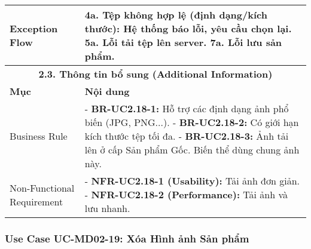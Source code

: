 \begin{longtable}{|m{4cm}|p{11cm}|}
Exception Flow & \textbf{4a. Tệp không hợp lệ (định dạng/kích thước):} Hệ thống báo lỗi, yêu cầu chọn lại. \newline \textbf{5a. Lỗi tải tệp lên server.} \newline \textbf{7a. Lỗi lưu sản phẩm.} \\
\hline
\multicolumn{2}{|c|}{\textbf{2.3. Thông tin bổ sung (Additional Information)}} \\
\hline
\textbf{Mục} & \textbf{Nội dung} \\
\hline
Business Rule & - \textbf{BR-UC2.18-1:} Hỗ trợ các định dạng ảnh phổ biến (JPG, PNG...). \newline - \textbf{BR-UC2.18-2:} Có giới hạn kích thước tệp tối đa. \newline - \textbf{BR-UC2.18-3:} Ảnh tải lên ở cấp Sản phẩm Gốc. Biến thể dùng chung ảnh này. \\
\hline
Non-Functional Requirement & - \textbf{NFR-UC2.18-1 (Usability):} Tải ảnh đơn giản. \newline - \textbf{NFR-UC2.18-2 (Performance):} Tải ảnh và lưu nhanh. \\
\hline
\end{longtable}

\subsubsection{Use Case UC-MD02-19: Xóa Hình ảnh Sản phẩm}

